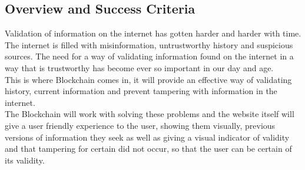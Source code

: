 \subsection{Overview and Success Criteria}

Validation of information on the internet has gotten harder and harder with time.
The internet is filled with misinformation, untrustworthy history and suspicious 
sources. The need for a way of validating information found on the internet in a 
way that is trustworthy has become ever so important in our day and age.\\

This is where Blockchain comes in, it will provide an effective way of validating
history, current information and prevent tampering with information in the internet.\\

The Blockchain will work with solving these problems and the website itself will
give a user friendly experience to the user, showing them visually, previous versions
of information they seek as well as giving a visual indicator of validity and that
tampering for certain did not occur, so that the user can be certain of its validity.
